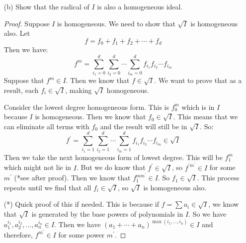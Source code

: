 \documentclass{article}
\begin{document}
\begin{itemize}
        \item [(b)] Show that the radical of $I$ is also a homogeneous ideal.
            \begin{proof}
                Suppose $I$ is homogeneous. We need to show that $\sqrt{I}$ is homogeneous also. Let
                    \begin{equation*}
                        f = f_{0} + f_{1} + f_{2} + \cdots + f_{d}
                    \end{equation*}
                Then we have:
                    \begin{equation*}
                        f^{m} = \sum_{i_{1} = 0}^{d}\sum_{i_{2} = 0}^{d}\cdots \sum_{i_{m} = 0}^{d}f_{i_{1}}f_{i_{2}}\cdots f_{i_{m}}
                    \end{equation*}
                Suppose that $f^{m} \in I$. Then we know that $f \in \sqrt{I}$. We want to prove that as a result, each $f_{i} \in \sqrt{I}$, making $\sqrt{I}$ homogeneous.

                Consider the lowest degree homogeneous form. This is $f_{0}^{m}$ which is in $I$ because $I$ is homogeneous. Then we know that $f_{0} \in \sqrt{I}$. This means that we can eliminate all terms with $f_{0}$ and the result will still be in $\sqrt{I}$. So:
                    \begin{equation*}
                        f^{\prime} = \sum_{i_{1} = 1}^{d}\sum_{i_{2} = 1}^{d}\cdots \sum_{i_{m} = 1}^{d}f_{i_{1}}f_{i_{2}}\cdots f_{i_{m}} \in \sqrt{I}
                    \end{equation*}
                Then we take the next homogeneous form of lowest degree. This will be $f_{1}^{m}$ which might not lie in $I$. But we do know that $f^{\prime} \in \sqrt{I}$, so $f^{\prime m^{\prime}} \in I$ for some $m^{\prime}$ (*see after proof). Then we know that $f_{1}^{m m^{\prime}} \in I$. So $f_{1} \in \sqrt{I}$. This process repeats until we find that all $f_{i} \in \sqrt{I}$, so $\sqrt{I}$ is homogeneous also.

                (*) Quick proof of this if needed. This is because if $f = \sum a_{i} \in \sqrt{I}$, we know that $\sqrt{I}$ is generated by the base powers of polynomials in $I$. So we have $a_{1}^{i_{1}}, a_{2}^{i_{2}}, \ldots, a_{n}^{i_{n}} \in I$. Then we have $(a_{1} + \cdots + a_{n})^{\max(i_{1}, \ldots, i_{n})} \in I$ and therefore, $f^{m^{\prime}} \in I$ for some power $m^{\prime}$.
            \end{proof}
    \end{itemize}
\end{document}
